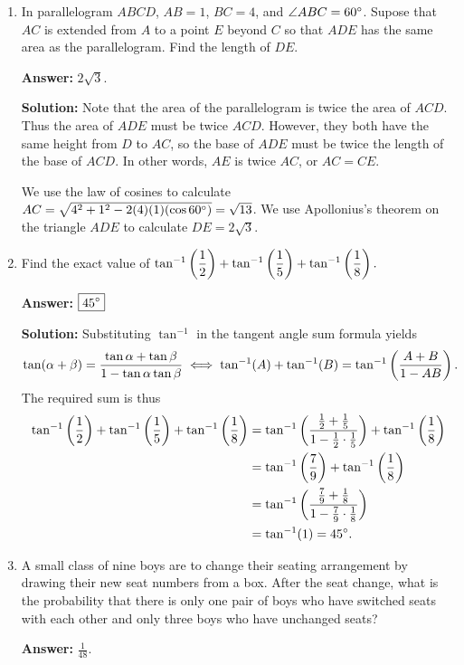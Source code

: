 \documentclass[11pt,paper=letter]{scrartcl}
\begin{document}
\begin{enumerate}[left=0pt]
\item In parallelogram $ABCD$, $AB = 1$, $BC = 4$, and $\angle ABC = 60^\circ$. Supose that $AC$ is extended from $A$ to a point $E$ beyond $C$ so that $ADE$ has the same area as the parallelogram. Find the length of $DE$.

\textbf{Answer:} $\boxed{2\sqrt{3}}$.

\textbf{Solution:} Note that the area of the parallelogram is twice the area of $ACD$. Thus the area of $ADE$ must be twice $ACD$. However, they both have the same height from $D$ to $AC$, so the base of $ADE$ must be twice the length of the base of $ACD$. In other words, $AE$ is twice $AC$, or $AC = CE$.

We use the law of cosines to calculate $AC = \sqrt{4^2 + 1^2 - 2(4)(1)(\cos 60^\circ)} = \sqrt{13}$. We use Apollonius's theorem on the triangle $ADE$ to calculate $DE = 2\sqrt{3}$.

\item Find the exact value of $\tan^{-1} \left( \dfrac{1}{2} \right) + \tan^{-1} \left( \dfrac{1}{5} \right) + \tan^{-1} \left( \dfrac{1}{8} \right).$

\textbf{Answer:} $\boxed{45^\circ}$

\textbf{Solution:} Substituting $\tan^{-1}$ in the tangent angle sum formula yields $$\tan(\alpha + \beta) = \frac{\tan{\alpha} + \tan{\beta}}{1 - \tan{\alpha}\tan{\beta}} \iff \tan^{-1}(A) + \tan^{-1}(B) = \tan^{-1}\left( \frac{A + B}{1 - AB} \right).$$ The required sum is thus
\begin{align*}
  \tan^{-1} \left( \dfrac{1}{2} \right) + \tan^{-1} \left( \dfrac{1}{5} \right) + \tan^{-1} \left( \dfrac{1}{8} \right) &= \tan^{-1}\left( \frac{\frac{1}{2} + \frac{1}{5}}{1 - \frac{1}{2} \cdot \frac{1}{5}} \right) + \tan^{-1}\left( \frac{1}{8} \right) \\
  &= \tan^{-1}\left( \frac{7}{9} \right) + \tan^{-1}\left( \frac{1}{8} \right) \\
  &= \tan^{-1}\left( \frac{\frac{7}{9} + \frac{1}{8}}{1 - \frac{7}{9} \cdot \frac{1}{8}} \right) \\
  &= \tan^{-1}(1) = 45^\circ.
\end{align*}

\item A small class of nine boys are to change their seating arrangement by drawing their new seat numbers from a box. After the seat change, what is the probability that there is only one pair of boys who have switched seats with each other and only three boys who have unchanged seats?

\textbf{Answer:} $\boxed{\frac{1}{48}}$.


\end{enumerate}
\end{document}
